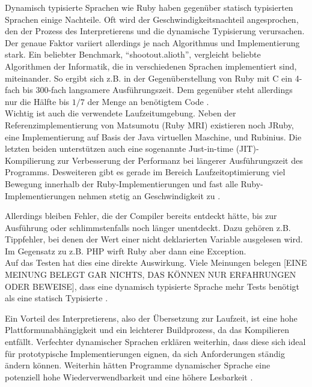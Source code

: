 Dynamisch typisierte Sprachen wie Ruby haben gegenüber statisch typisierten Sprachen einige Nachteile. Oft wird der Geschwindigkeitsnachteil angesprochen, den der Prozess des Interpretierens und die dynamische Typisierung verursachen.
Der genaue Faktor variiert allerdings je nach Algorithmus und Implementierung stark. Ein beliebter Benchmark, "`shootout.alioth"', vergleicht beliebte Algorithmen der Informatik, die in verschiedenen Sprachen implementiert sind, miteinander. So ergibt sich z.B. in der Gegenüberstellung von Ruby mit C ein 4-fach bis 300-fach langsamere Ausführungszeit. Dem gegenüber steht allerdings nur die Hälfte bis $1/7$ der Menge an benötigtem Code \citep{computer_language_benchmarks_game_ruby_2011}. \\
Wichtig ist auch die verwendete Laufzeitumgebung. Neben der Referenzimplementierung von Matsumotu (Ruby MRI) existieren noch JRuby, eine Implementierung auf Basis der Java virtuellen Maschine, und Rubinius. Die letzten beiden unterstützen auch eine sogenannte Just-in-time (JIT)-Kompilierung zur Verbesserung der Performanz bei längerer Ausführungszeit des Programms. Desweiteren gibt es gerade im Bereich Laufzeitoptimierung viel Bewegung innerhalb der Ruby-Implementierungen und fast alle Ruby-Implementierungen nehmen stetig an Geschwindigkeit zu \citep{antonio_cangiano_great_2010}.


Allerdings bleiben Fehler, die der Compiler bereits entdeckt hätte, bis zur Ausführung oder schlimmstenfalls noch länger unentdeckt. Dazu gehören z.B. Tippfehler, bei denen der Wert einer nicht deklarierten Variable ausgelesen wird. Im Gegensatz zu z.B. PHP wirft Ruby aber dann eine Exception.\\
Auf das Testen hat dies eine direkte Auswirkung. Viele Meinungen belegen [EINE MEINUNG BELEGT GAR NICHTS, DAS KÖNNEN NUR ERFAHRUNGEN ODER BEWEISE], dass eine dynamisch typisierte Sprache mehr Tests benötigt als eine statisch Typisierte \citep{daniel_spiewak_dynamic_2010}.



Ein Vorteil des Interpretierens, also der Übersetzung zur Laufzeit, ist eine hohe Plattformunabhängigkeit und ein leichterer Buildprozess, da das Kompilieren entfällt.
Verfechter dynamischer Sprachen erklären weiterhin, dass diese sich ideal für prototypische Implementierungen eignen, da sich Anforderungen ständig ändern können. Weiterhin hätten Programme dynamischer Sprache eine potenziell hohe Wiederverwendbarkeit und eine höhere Lesbarkeit \citep{meijer_static_2005} \citep{ousterhout_scripting:_1998}.


